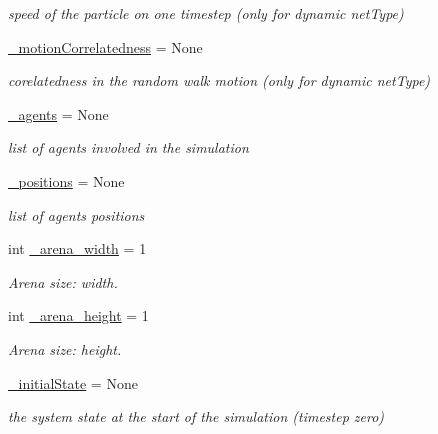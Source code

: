 \begin{DoxyCompactItemize}
\begin{DoxyCompactList}\small\item\em speed of the particle on one timestep (only for dynamic net\+Type) \end{DoxyCompactList}\item 
\hyperlink{class_mu_mo_t_1_1_mu_mo_t_1_1_mu_mo_tmultiagent_view_aa120ae2cb05f320428d90e34a49102ab}{\+\_\+motion\+Correlatedness} = None
\begin{DoxyCompactList}\small\item\em corelatedness in the random walk motion (only for dynamic net\+Type) \end{DoxyCompactList}\item 
\hyperlink{class_mu_mo_t_1_1_mu_mo_t_1_1_mu_mo_tmultiagent_view_a5032de31aad9de4528138249999e7d5f}{\+\_\+agents} = None
\begin{DoxyCompactList}\small\item\em list of agents involved in the simulation \end{DoxyCompactList}\item 
\hyperlink{class_mu_mo_t_1_1_mu_mo_t_1_1_mu_mo_tmultiagent_view_a8be9986760a86837e04718906d18d596}{\+\_\+positions} = None
\begin{DoxyCompactList}\small\item\em list of agents\textquotesingle{} positions \end{DoxyCompactList}\item 
int \hyperlink{class_mu_mo_t_1_1_mu_mo_t_1_1_mu_mo_tmultiagent_view_a372c083f5428e7f8a68298ec9dcca941}{\+\_\+arena\+\_\+width} = 1
\begin{DoxyCompactList}\small\item\em Arena size\+: width. \end{DoxyCompactList}\item 
int \hyperlink{class_mu_mo_t_1_1_mu_mo_t_1_1_mu_mo_tmultiagent_view_a12711c70e125709b78f820722ba74d09}{\+\_\+arena\+\_\+height} = 1
\begin{DoxyCompactList}\small\item\em Arena size\+: height. \end{DoxyCompactList}\item 
\hyperlink{class_mu_mo_t_1_1_mu_mo_t_1_1_mu_mo_tmultiagent_view_a8afeb8cf5705c6b521f7d6658dab955b}{\+\_\+initial\+State} = None
\begin{DoxyCompactList}\small\item\em the system state at the start of the simulation (timestep zero) \end{DoxyCompactList}\item 

\end{DoxyCompactItemize}
